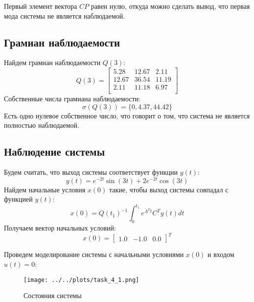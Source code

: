 Первый элемент вектора $CP$ равен нулю, откуда можно сделать вывод, что первая мода системы не является наблюдаемой. 

\subsection{Грамиан наблюдаемости}
Найдем грамиан наблюдаемости $Q(3)$:
\begin{equation}
    Q(3) = \begin{bmatrix}
        5.28  & 12.67  & 2.11 \\ 
        12.67  & 36.54  & 11.19 \\ 
        2.11  & 11.18  & 6.97 \\ 
        \end{bmatrix}
\end{equation}
Собственные числа грамиана наблюдаемости:
\begin{equation}
    \sigma(Q(3)) = \{0, 4.37, 44.42\}
\end{equation}
Есть одно нулевое собственное число, что говорит о том, что система не является полностью наблюдаемой.

\subsection{Наблюдение системы}
Будем считать, что выход системы соответствует функции $y(t)$:
\begin{equation}
    y(t) = e^{-2t} \sin(3t) +2e^{-2t} \cos(3t) 
\end{equation}
Найдем начальные условия $x(0)$ такие, чтобы выход системы совпадал с функцией $y(t)$:
\begin{equation}
    x(0) = Q(t_1)^{-1} \int_0^{t_1} e^{A^Tt}C^Ty(t)dt
\end{equation}
Получаем вектор начальных условий:
\begin{equation}
    x(0) = \begin{bmatrix}
        1.0 & -1.0 & 0.0
    \end{bmatrix}^T
\end{equation}

Проведем моделирование системы с начальными условиями $x(0)$ и входом $u(t) = 0$: 

\begin{figure}[H]
    \centering
    \texttt{[image: ../../plots/task\_4\_1.png]}
    \caption{Состояния системы}
    \label{fig:task4_states}
\end{figure}

